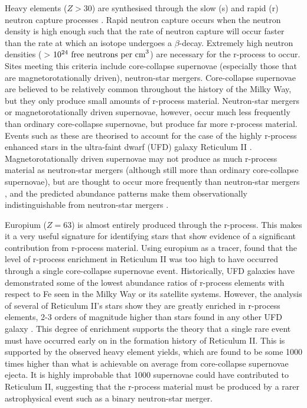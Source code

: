 \documentclass[a4paper,fleqn,usenatbib]{mnras}
\begin{document}
	Heavy elements ($Z > 30$) are synthesised through the slow (s) and rapid (r) neutron capture processes \citep[e.g.,][]{Burbidge1957,Sneden2008}.
	Rapid neutron capture occurs when the neutron density is high enough such that the rate of neutron capture will occur faster than the rate at which an isotope undergoes a $\beta$-decay. Extremely high neutron densities ($>$$10^{24}\ \rm{free\ neutrons\ per\ cm}^{3}$) are necessary for the r-process to occur. Sites meeting this criteria include core-collapse supernovae (especially those that are magnetorotationally driven), neutron-star mergers. Core-collapse supernovae are believed to be relatively common throughout the history of the Milky Way, but they only produce small amounts of r-process material. Neutron-star mergers or magnetorotationally driven supernovae, however, occur much less frequently than ordinary core-collapse supernovae, but produce far more r-process material. Events such as these are theorised to account for the case of the highly r-process enhanced stars in the ultra-faint dwarf (UFD) galaxy Reticulum II \citep{Ji2016}.
	Magnetorotationally driven supernovae may not produce as much r-process material as neutron-star mergers (although still more than ordinary core-collapse supernovae), but are thought to occur more frequently than neutron-star mergers \citep[e.g.,][]{Li2011, LIGO2016}, and the predicted abundance patterns make them observationally indistinguishable from neutron-star mergers \citep{Ji2016}.
	
	Europium ($Z=63$) is almost entirely produced through the r-process. This makes it a very useful signature for identifying stars that show evidence of a significant contribution from r-process material. Using europium as a tracer, \cite{Ji2016} found that the level of r-process enrichment in  Reticulum II was too high to have occurred through a single core-collapse supernovae event.
	Historically, UFD galaxies have demonstrated some of the lowest abundance ratios of r-process elements with respect to Fe seen in the Milky Way or its satellite systems. However, the analysis of several of Reticulum II's stars show they are greatly enriched in r-process elements, 2-3 orders of magnitude higher than stars found in any other UFD galaxy \citep{Ji2016}. This degree of enrichment supports the theory that a single rare event must have occurred early on in the formation history of Reticulum II. This is supported by the observed heavy element yields, which are found to be some 1000 times higher than what is achievable on average from core-collapse supernovae ejecta. It is highly improbable that 1000 supernovae could have contributed to Reticulum II, suggesting that the r-process material must be produced by a rarer astrophysical event such as a binary neutron-star merger.
	
\end{document}
